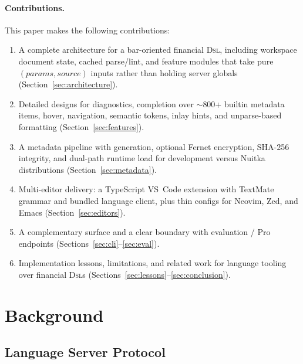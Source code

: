 \documentclass[11pt,a4paper]{article}
\begin{document}
\paragraph{Contributions.}
This paper makes the following contributions:
\begin{enumerate}[leftmargin=*]
  \item A complete \lsp{} architecture for a bar-oriented financial \textsc{Dsl},
        including workspace document state, cached parse/lint, and feature modules
        that take pure \((params, source)\) inputs rather than holding server globals
        (Section~\ref{sec:architecture}).
  \item Detailed designs for diagnostics, completion over \(\sim\)800+ builtin metadata
        items, hover, navigation, semantic tokens, inlay hints, and unparse-based
        formatting (Section~\ref{sec:features}).
  \item A metadata pipeline with generation, optional Fernet encryption, SHA-256
        integrity, and dual-path runtime load for development versus Nuitka
        distributions (Section~\ref{sec:metadata}).
  \item Multi-editor delivery: a TypeScript VS~Code extension with TextMate grammar
        and bundled language client, plus thin configs for Neovim, Zed, and Emacs
        (Section~\ref{sec:editors}).
  \item A complementary \cli{} surface and a clear boundary with evaluation / Pro
        \api{} endpoints (Sections~\ref{sec:cli}--\ref{sec:eval}).
  \item Implementation lessons, limitations, and related work for language tooling
        over financial \textsc{Dsl}s (Sections~\ref{sec:lessons}--\ref{sec:conclusion}).
\end{enumerate}

\section{Background}
\label{sec:background}

\subsection{Language Server Protocol}
\label{sec:bg-lsp}
\end{document}
